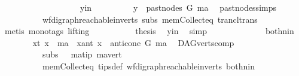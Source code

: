 \begin{isabellebody}
\ \ \ \ \ \ \isamarkupfalse%
\isanewline
\ \ \ \ \isamarkupfalse%
\isanewline
\ \ \ \ \ \ \isamarkupfalse%
\ y{\isacharunderscore}{\kern0pt}in\isanewline
\ \ \ \ \ \ \isamarkupfalse%
\ \isamarkupfalse%
\ {\isachardoublequoteopen}y\ {\isasymin}\ past{\isacharunderscore}{\kern0pt}nodes\ G\ ma{\isachardoublequoteclose}\ \isamarkupfalse%
\ past{\isacharunderscore}{\kern0pt}nodes{\isachardot}{\kern0pt}simps\ \isamarkupfalse%
\ {}{\isacharparenleft}{\kern0pt}{}{\isacharcomma}{\kern0pt}{}{\isacharparenright}{\kern0pt}\isanewline
\ \ \ \ \ \ \ \ \ \ wf{\isacharunderscore}{\kern0pt}digraph{\isachardot}{\kern0pt}reachable{}{\isacharunderscore}{\kern0pt}in{\isacharunderscore}{\kern0pt}verts{\isacharparenleft}{\kern0pt}{}{\isacharparenright}{\kern0pt}\ subs\ mem{\isacharunderscore}{\kern0pt}Collect{\isacharunderscore}{\kern0pt}eq\ trancl{\isacharunderscore}{\kern0pt}trans\isanewline
\ \ \ \ \ \ \ \ \isamarkupfalse%
\ {\isacharparenleft}{\kern0pt}metis\ {\isacharparenleft}{\kern0pt}mono{\isacharunderscore}{\kern0pt}tags{\isacharcomma}{\kern0pt}\ lifting{\isacharparenright}{\kern0pt}{\isacharparenright}{\kern0pt}\ \isanewline
\ \ \ \ \ \ \isamarkupfalse%
\ \isamarkupfalse%
\ {\isacharquery}{\kern0pt}thesis\ \isamarkupfalse%
\ y{\isacharunderscore}{\kern0pt}in\ \isamarkupfalse%
\ simp\ \isanewline
\ \ \ \ \isamarkupfalse%
\isanewline
\ \ \ \ \ \ \isamarkupfalse%
\ both{\isacharunderscore}{\kern0pt}nin\isanewline
\ \ \ \ \ \ \isamarkupfalse%
\ {\isacharparenleft}{\kern0pt}x{\isacharunderscore}{\kern0pt}t{\isacharparenright}{\kern0pt}\ {\isachardoublequoteopen}x\ {\isacharequal}{\kern0pt}\ ma{\isachardoublequoteclose}\ {\isacharbar}{\kern0pt}\ {\isacharparenleft}{\kern0pt}x{\isacharunderscore}{\kern0pt}ant{\isacharparenright}{\kern0pt}\ {\isachardoublequoteopen}x\ {\isasymin}\ anticone\ G\ ma{\isachardoublequoteclose}\ \isamarkupfalse%
\ DAG{\isachardot}{\kern0pt}verts{\isacharunderscore}{\kern0pt}comp{}\ \isanewline
\ \ \ \ \ \ \ \ \ \ subs\ {}\ \ ma{\isacharunderscore}{\kern0pt}tip\ ma{\isacharunderscore}{\kern0pt}vert\ \isanewline
\ \ \ \ \ \ \ \ \ \ mem{\isacharunderscore}{\kern0pt}Collect{\isacharunderscore}{\kern0pt}eq\ tips{\isacharunderscore}{\kern0pt}def\ wf{\isacharunderscore}{\kern0pt}digraph{\isachardot}{\kern0pt}reachable{}{\isacharunderscore}{\kern0pt}in{\isacharunderscore}{\kern0pt}verts{\isacharparenleft}{\kern0pt}{}{\isacharparenright}{\kern0pt}\ both{\isacharunderscore}{\kern0pt}nin\isanewline

\end{isabellebody}
